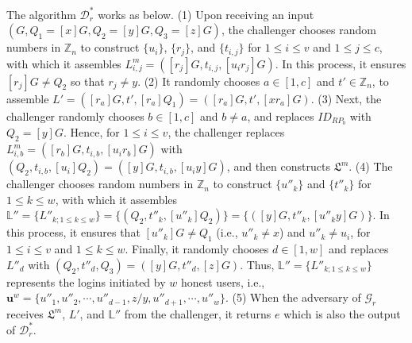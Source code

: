 The algorithm $\mathcal{D}^*_r$ works as below. (1) Upon receiving an input $(G, Q_1=[x]G, Q_2=[y]G, Q_3=[z]G)$, %
the challenger
chooses random numbers in $\mathbb{Z}_n$ to construct $\{u_i\}$, $\{r_j\}$, and $\{t_{i, j}\}$ for $1 \le i \le v$ and $1 \le j \le c$, with which it assembles $L^m_{i, j}=([r_j]G, t_{i,j}, [u_ir_j]G)$.
In this process, it ensures $[r_{j}]G \neq Q_2$ so that $r_j \neq y$.  %
(2) It randomly chooses $a \in [1, c]$ and $t' \in \mathbb{Z}_n$, to assemble $L' = ([r_{a}]G, t', [r_{a}]Q_1) = ([r_{a}]G, t', [xr_{a}]G)$.
(3)
Next, the challenger randomly chooses $b \in [1, c]$ and $b \neq a$, and replaces $ID_{RP_b}$ with $Q_2 = [y]G$.
Hence, for $1 \le i \le v$, the challenger replaces $L^m_{i, b}=([r_b]G, t_{i,b}, [u_ir_b]G)$ with $(Q_2, t_{i,b}, [u_i]Q_2) = ([y]G, t_{i,b}, [u_iy]G)$, and then constructs $\mathfrak{L}^m$.
(4) The challenger chooses random numbers in $\mathbb{Z}_n$ to construct $\{u''_k\}$ and $\{t''_k\}$ for $1 \leq k \leq w$,
 with which it assembles $\mathbb{L}'' = \{L''_{k; 1\leq k \leq w}\} = \{(Q_2, t''_k, [u''_k]Q_2)\} = \{([y]G, t''_k, [u''_ky]G)\}$.
In this process, it ensures that $[u''_k]G \neq Q_1$ (i.e., $u''_k \neq x$) and $u''_k \neq u_i$,
 for $1 \le i \le v$ and $1 \le k \le w$.
Finally, it randomly chooses $d \in [1, w]$ and replaces $L''_{d}$ with $(Q_2, t''_d, Q_3) = ([y]G, t''_d, [z]G)$.
 Thus, $\mathbb{L}'' = \{L''_{k;1\leq k \leq w}\}$ represents the logins initiated by $w$ honest users, i.e., $\mathbf{u}^w=\{u''_1, u''_2, \cdots, u''_{d-1}, z/y, u''_{d+1}, \cdots, u''_w\}$.
 (5) When the adversary of $\mathcal{G}_r$ receives $\mathfrak{L}^m$, $L'$, and $\mathbb{L}''$ from the challenger, it returns $e$ which is also the output of $\mathcal{D}^*_r$.

